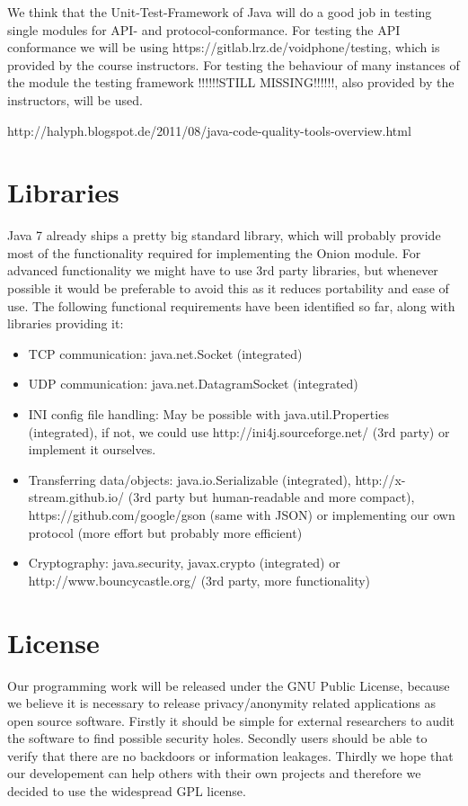 \documentclass{article}
\begin{document}
We think that the Unit-Test-Framework of Java will do a good job in testing
single modules for API- and protocol-conformance. For testing the API conformance we will be using https://gitlab.lrz.de/voidphone/testing, which is provided by the course instructors. For testing the behaviour of
many instances of the module the testing framework !!!!!!STILL MISSING!!!!!!, also provided by the instructors, will be used.

http://halyph.blogspot.de/2011/08/java-code-quality-tools-overview.html

\section{Libraries}
Java 7 already ships a pretty big standard library, which will probably provide most of the functionality required for implementing the Onion module. For advanced functionality we might have to use 3rd party libraries, but whenever possible it would be preferable to avoid this as it reduces portability and ease of use. 
The following functional requirements have been identified so far, along with libraries providing it:
\begin{itemize}
\item TCP communication: java.net.Socket (integrated)
\item UDP communication: java.net.DatagramSocket (integrated)
\item INI config file handling: May be possible with java.util.Properties (integrated), if not, we could use http://ini4j.sourceforge.net/ (3rd party) or implement it ourselves.
\item Transferring data/objects: java.io.Serializable (integrated), http://x-stream.github.io/ (3rd party but human-readable and more compact), https://github.com/google/gson (same with JSON) or implementing our own protocol (more effort but probably more efficient)
\item Cryptography: java.security, javax.crypto (integrated) or http://www.bouncycastle.org/ (3rd party, more functionality)
\end{itemize}



\section{License}
Our programming work will be released under the GNU Public License, because we
believe it is necessary to release privacy/anonymity related applications as
open source software. Firstly it should be simple for external researchers to
audit the software to find possible security holes. Secondly users should be
able to verify that there are no backdoors or information leakages. Thirdly we
hope that our developement can help others with their own projects and
therefore we decided to use the widespread GPL license.
\end{document}
